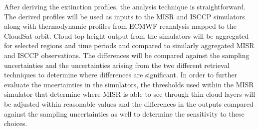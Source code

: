 \documentclass{article}
\begin{document}
After deriving the extinction profiles, the analysis technique is straightforward. The derived profiles will be used as inputs to the MISR and ISCCP simulators along with thermodynamic profiles from ECMWF reanalysis mapped to the CloudSat orbit. Cloud top height output from the simulators will be aggregated for selected regions and time periods and compared to similarly aggregated MISR and ISCCP observations. The differences will be compared against the sampling uncertainties and the uncertainties arising from the two different retrieval techniques to determine where differences are significant. In order to further evaluate the uncertainties in the simulators, the thresholds used within the MISR simulator that determine where MISR is able to see through thin cloud layers will be adjusted within reasonable values and the differences in the outputs compared against the sampling uncertainties as well to determine the sensitivity to these choices.



\end{document}

